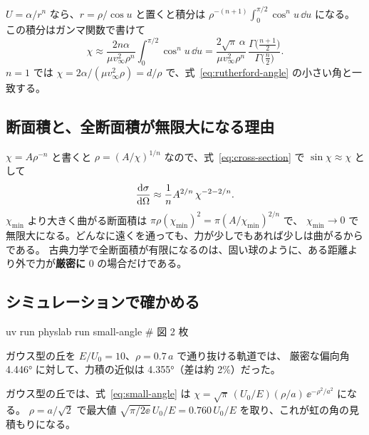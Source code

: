 $U=\alpha/r^n$ なら、$r=\rho/\cos u$ と置くと積分は $\rho^{-(n+1)}\int_0^{\pi/2}\cos^nu\,\dd u$ になる。
この積分はガンマ関数で書けて
\begin{equation}
  \chi\approx\frac{2n\alpha}{\mu v_\infty^2\rho^n}\int_0^{\pi/2}\cos^nu\,\dd u
  =\frac{2\sqrt\pi\,\alpha}{\mu v_\infty^2\rho^n}\,
  \frac{\Gamma\bigl(\frac{n+1}{2}\bigr)}{\Gamma\bigl(\frac n2\bigr)} .
  \label{eq:small-angle-power}
\end{equation}
$n=1$ では $\chi=2\alpha/(\mu v_\infty^2\rho)=d/\rho$ で、式~\eqref{eq:rutherford-angle} の小さい角と一致する。

\subsection{断面積と、全断面積が無限大になる理由}

$\chi=A\rho^{-n}$ と書くと $\rho=(A/\chi)^{1/n}$ なので、式~\eqref{eq:cross-section} で $\sin\chi\approx\chi$ として
\begin{equation}
  \frac{\mathrm{d} \sigma}{\mathrm{d} \Omega}\approx\frac1n A^{2/n}\,\chi^{-2-2/n}.
  \label{eq:small-angle-sigma}
\end{equation}
$\chi_{\min}$ より大きく曲がる断面積は $\pi\rho(\chi_{\min})^2=\pi(A/\chi_{\min})^{2/n}$ で、
$\chi_{\min}\to0$ で無限大になる。どんなに遠くを通っても、力が少しでもあれば少しは曲がるからである。
古典力学で全断面積が有限になるのは、固い球のように、ある距離より外で力が\textbf{厳密に} 0 の場合だけである。

\subsection{シミュレーションで確かめる}

\begin{simbox}
\begin{terminal}
uv run physlab run small-angle      # 図 2 枚
\end{terminal}
\end{simbox}

ガウス型の丘を $E/U_0=10$、$\rho=0.7\,a$ で通り抜ける軌道では、
厳密な偏向角 \ang{4.446} に対して、力積の近似は \ang{4.355}（差は約 2\%）だった。


ガウス型の丘では、式~\eqref{eq:small-angle} は $\chi=\sqrt\pi\,(U_0/E)(\rho/a)\,\ee^{-\rho^2/a^2}$ になる。
$\rho=a/\sqrt2$ で最大値 $\sqrt{\pi/2\ee}\,U_0/E=0.760\,U_0/E$ を取り、これが虹の角の見積もりになる。

